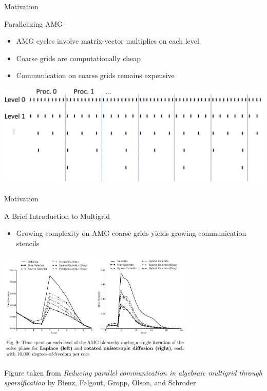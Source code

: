 \documentclass[18pt,xcolor=table]{beamer}
\begin{document}
\begin{frame}{Motivation}
\begin{block}{Parallelizing AMG}
\begin{itemize}
\item AMG cycles involve matrix-vector multiplies on each level 
\item Coarse grids are computationally cheap
\item Communication on coarse grids remains expensive
\end{itemize}
\end{block}

\centering
\includegraphics[width=\textwidth]{figures/compGridCreation1D2}

\end{frame}

\begin{frame}{Motivation}
\begin{block}{A Brief Introduction to Multigrid}
\begin{itemize}
\item Growing complexity on AMG coarse grids yields growing communication stencils
\end{itemize}
\end{block}

\centering
\includegraphics[width=0.7\textwidth]{figures/nonGalerkinFigure}

\tiny{Figure taken from \emph{Reducing parallel communication in algebraic multigrid through sparsification} by Bienz, Falgout, Gropp, Olson, and Schroder.}

\end{frame}
\end{document}
